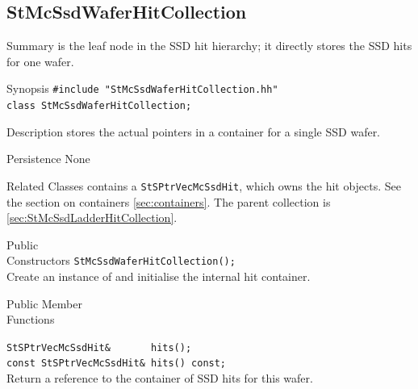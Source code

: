 %
%
\subsection{StMcSsdWaferHitCollection}
 
\label{sec:StMcSsdWaferHitCollection}
\begin{Entry}
\item[Summary]
     is the leaf node in the SSD hit
    hierarchy; it directly stores the SSD hits for one wafer.

\item[Synopsis]
    \verb+#include "StMcSsdWaferHitCollection.hh"+\\
    \verb+class StMcSsdWaferHitCollection;+\\

\item[Description]
     stores the actual
     pointers in a  container
    for a single SSD wafer.

\item[Persistence]
    None

\item[Related Classes]
     contains a
    {\tt StSPtrVecMcSsdHit}, which owns the hit objects.  See the
    section on containers \ref{sec:containers}.
    The parent collection is
     \ref{sec:StMcSsdLadderHitCollection}.

\item[Public\\ Constructors]
    \verb+StMcSsdWaferHitCollection();+\\
    Create an instance of  and
    initialise the internal hit container.

\item[Public Member\\ Functions]

    \verb+StSPtrVecMcSsdHit&       hits();+\\
    \verb+const StSPtrVecMcSsdHit& hits() const;+\\
    Return a reference to the container of SSD hits for this wafer.


\end{Entry}
